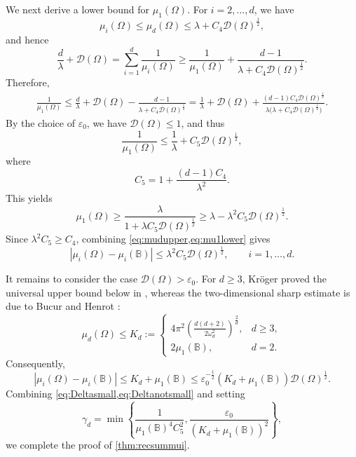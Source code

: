 \documentclass{amsart}
\numberwithin{equation}{section}
\theoremstyle{plain}
\theoremstyle{definition}
\theoremstyle{plain}
\theoremstyle{remark}
\numberwithin{figure}{section}
\newcommand{\B}{\mathbb{B}}
\newcommand{\D}{\mathcal{D}(\Omega)}
\begin{document}
We next derive a lower bound for $\mu_1(\Omega)$. For $i=2,\dots,d$, we have
\[
    \mu_i(\Omega)\leq \mu_d(\Omega) \leq \lambda+C_4\D^{\frac{1}{2}},
\]
and hence
\[
    \frac{d}{\lambda}+\D = \sum_{i=1}^d\frac{1}{\mu_i(\Omega)} \geq \frac{1}{\mu_1(\Omega)} + \frac{d-1}{\lambda+C_4\D^{\frac{1}{2}}}.
\]
Therefore,
\[
\begin{aligned}
    \frac{1}{\mu_1(\Omega)}   \leq \frac{d}{\lambda}+\D - \frac{d-1}{\lambda+C_4\D^{\frac{1}{2}}}        = \frac{1}{\lambda} + \D + \frac{(d-1)C_4\D^{\frac{1}{2}}} {\lambda\big(\lambda+C_4\D^{\frac{1}{2}}\big)}.
\end{aligned}
\]
By the choice of $\varepsilon_0$, we have $\D\leq 1$, and thus
\[
    \frac{1}{\mu_1(\Omega)} \leq \frac{1}{\lambda}+C_5\D^{\frac{1}{2}},
\]
where
\[
    C_5 = 1+\frac{(d-1)C_4}{\lambda^2}.
\]
This yields
\begin{equation}
    \label{eq:mu1lower}
    \mu_1(\Omega) \geq \frac{\lambda}{1+\lambda C_5\D^{\frac{1}{2}}} \geq \lambda-\lambda^2 C_5\D^{\frac{1}{2}}.
\end{equation}
Since $\lambda^2C_5\geq C_4$, combining \cref{eq:mudupper,eq:mu1lower} gives
\begin{equation}
    \label{eq:Deltasmall}
    |\mu_i(\Omega)-\mu_i(\B)|\leq \lambda^2 C_5 \D^{\frac{1}{2}},\qquad i=1,\dots,d.
\end{equation}

It remains to consider the case $\D>\varepsilon_0$. For $d\geq3$, Kr\"oger proved the universal upper bound below in \cite{Kro92}, whereas the two-dimensional sharp estimate is due to Bucur and Henrot \cite{BH19}:
\begin{equation}
    \label{eq:Krogerup}
    \mu_d(\Omega) \leq K_d :=
    \begin{cases}
        4\pi^2 \left( \frac{d(d+2)}{2\omega_d^2} \right)^{\frac{2}{d}}, &d\geq 3,\\
        2\mu_1(\B), & d=2.
    \end{cases}
\end{equation}
Consequently,
\begin{equation}
    \label{eq:Deltanotsmall}
    |\mu_i(\Omega)-\mu_i(\B)| \leq K_d+\mu_1(\B)\leq \varepsilon_0^{-\frac{1}{2}}(K_d+\mu_1(\B))\D^{\frac{1}{2}}.
\end{equation}
Combining \cref{eq:Deltasmall,eq:Deltanotsmall} and setting
\begin{equation}
    \label{eq:gammad}
    \gamma_d = \min\left\{\frac{1}{\mu_1(\B)^4 C_5^2}, \frac{\varepsilon_0}{(K_d+\mu_1(\B))^2} \right\},
\end{equation}
we complete the proof of \cref{thm:recsummui}.
\end{document}
